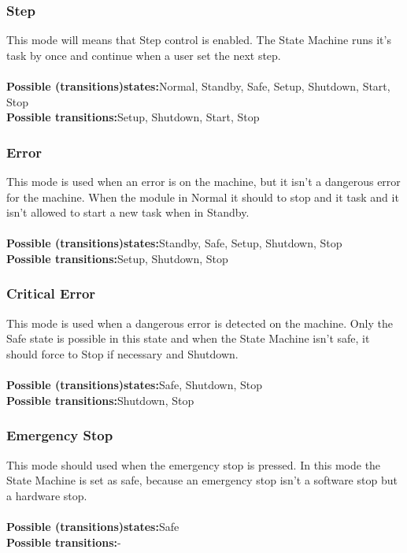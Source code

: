 \documentclass[12pt,a4paper]{report}
\begin{document}
\subsubsection{Step}This mode will means that Step control is enabled. The State Machine runs it's task by once and continue when a user set the next step.\\\\
\textbf{Possible (transitions)states:}Normal, Standby, Safe, Setup, Shutdown, Start, Stop\\
\textbf{Possible transitions:}Setup, Shutdown, Start, Stop

\subsubsection{Error}This mode is used when an error is on the machine, but it isn't a dangerous error for the machine. When the module in Normal it should to stop and it task and it isn't allowed to start a new task when in Standby.\\\\
\textbf{Possible (transitions)states:}Standby, Safe, Setup, Shutdown, Stop\\
\textbf{Possible transitions:}Setup, Shutdown, Stop

\subsubsection{Critical Error}This mode is used when a dangerous error is detected on the machine. Only the Safe state is possible in this state and when the State Machine isn't safe, it should force to Stop if necessary and Shutdown.\\\\
\textbf{Possible (transitions)states:}Safe, Shutdown, Stop\\
\textbf{Possible transitions:}Shutdown, Stop

\subsubsection{Emergency Stop}This mode should used when the emergency stop is pressed. In this mode the State Machine is set as safe, because an emergency stop isn't a software stop but a hardware stop.\\\\
\textbf{Possible (transitions)states:}Safe\\
\textbf{Possible transitions:}-
\end{document}
